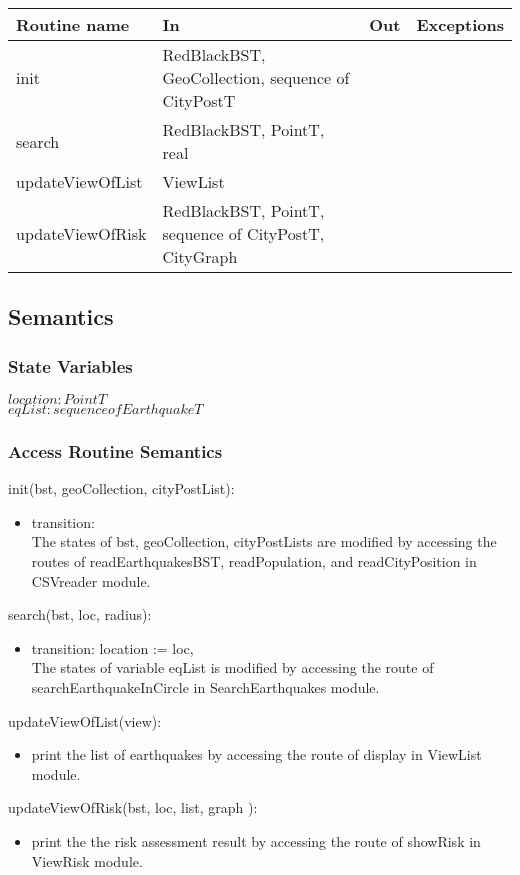 \documentclass[12pt]{article}
\begin{document}
\begin{tabular}{| l | l | l | p{2.3cm} |}
\hline
\textbf{Routine name} & \textbf{In} & \textbf{Out} & \textbf{Exceptions}\\
\hline
init & RedBlackBST, GeoCollection, sequence of CityPostT &  &  ~\\
\hline
search & RedBlackBST, PointT, real &  &  ~\\
\hline
updateViewOfList & ViewList &  &  ~\\
\hline
updateViewOfRisk & RedBlackBST, PointT, sequence of CityPostT, CityGraph &  &  ~\\
\hline
\end{tabular}

\subsection* {Semantics}

\subsubsection* {State Variables}
$\mathit{location} : PointT$ \\
$\mathit{eqList} : sequence of EarthquakeT$ \\

\subsubsection* {Access Routine Semantics}

\noindent init(bst, geoCollection, cityPostList):
\begin{itemize}
\item transition: \\
The states of bst, geoCollection, cityPostLists are modified by accessing the routes of readEarthquakesBST, readPopulation, and readCityPosition  in CSVreader module.
\end{itemize}

\noindent search(bst, loc, radius):
\begin{itemize}
\item transition: location := loc,\\
The states of variable eqList is modified by accessing the route of searchEarthquakeInCircle in SearchEarthquakes module.
\end{itemize}


\noindent updateViewOfList(view):
\begin{itemize}
\item print the list of earthquakes by accessing the route of display in ViewList module.
\end{itemize}

\noindent updateViewOfRisk(bst, loc, list, graph ):
\begin{itemize}
\item print the the risk assessment result by accessing the route of showRisk in ViewRisk module.
\end{itemize}
\end{document}
